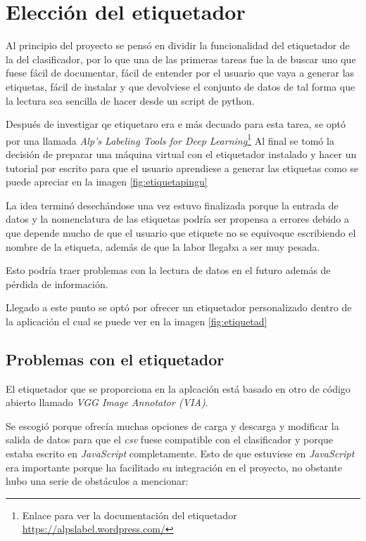 \label{c.5}

\section{Elección del etiquetador}

Al principio del proyecto se pensó en dividir la funcionalidad del etiquetador de la del clasificador, por lo que una de las primeras tareas fue la de buscar uno que fuese fácil de documentar, fácil de entender por el usuario que vaya a generar las etiquetas, fácil de instalar y que devolviese el conjunto de datos de tal forma que la lectura sea sencilla de hacer desde un script de python.

Después de investigar qe etiquetaro era e más decuado para esta tarea, se optó por una llamada \textit{Alp's Labeling Tools for Deep Learning}\footnote{Enlace para ver la documentación del etiquetador \url{https://alpslabel.wordpress.com/}}
Al final se tomó la decisión de preparar una máquina virtual con el etiquetador instalado y hacer un tutorial por escrito para que el usuario aprendiese a generar las etiquetas como se puede apreciar en la imagen \ref{fig:etiquetapingu}


La idea terminó desechándose una vez estuvo finalizada porque la entrada de datos y la nomenclatura de las etiquetas podría ser propensa a errores debido a que depende mucho de que el usuario que etiquete no se equivoque escribiendo el nombre de la etiqueta, además de que la labor llegaba a ser muy pesada.

Esto podría traer problemas con la lectura de datos en el futuro además de pérdida de información.

Llegado a este punto se optó por ofrecer un etiquetador personalizado dentro de la aplicación el cual se puede ver en la imagen \ref{fig:etiquetad}

\subsection{Problemas con el etiquetador}
El etiquetador que se proporciona en la aplcación está basado en otro de código abierto llamado \textit{VGG Image Annotator (VIA)}. 

Se escogió porque ofrecía muchas opciones de carga y descarga y modificar la salida de datos para que el \textit{csv} fuese compatible con el clasificador y porque estaba escrito en \textit{JavaScript} completamente. Esto de que estuviese en \textit{JavaScript} era importante porque ha facilitado su integración en el proyecto, no obstante hubo una serie de obstáculos a mencionar:

